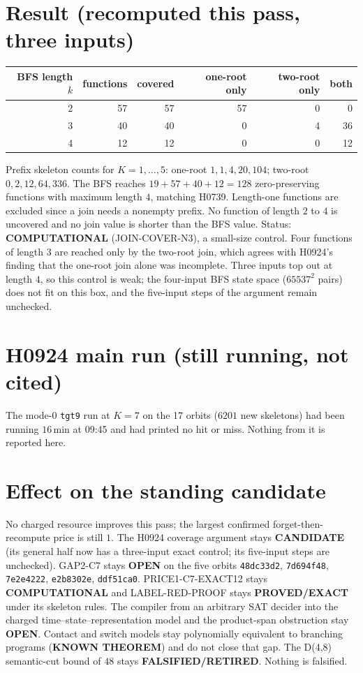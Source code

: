 \documentclass[11pt]{article}
\begin{document}
\section*{Result (recomputed this pass, three inputs)}
\begin{center}
\begin{tabular}{rrrrrr}
BFS length $k$ & functions & covered & one-root only & two-root only & both\\ \hline
2 & 57 & 57 & 57 & 0 & 0\\
3 & 40 & 40 & 0 & 4 & 36\\
4 & 12 & 12 & 0 & 0 & 12\\
\end{tabular}
\end{center}
Prefix skeleton counts for $K=1,\dots,5$: one-root $1,1,4,20,104$; two-root $0,2,12,64,336$. The BFS reaches $19+57+40+12=128$ zero-preserving functions with maximum length $4$, matching H0739. Length-one functions are excluded since a join needs a nonempty prefix. No function of length $2$ to $4$ is uncovered and no join value is shorter than the BFS value. Status: \textbf{COMPUTATIONAL} (JOIN-COVER-N3), a small-size control. Four functions of length $3$ are reached only by the two-root join, which agrees with H0924's finding that the one-root join alone was incomplete. Three inputs top out at length $4$, so this control is weak; the four-input BFS state space ($65537^2$ pairs) does not fit on this box, and the five-input steps of the argument remain unchecked.

\section*{H0924 main run (still running, not cited)}
The mode-0 \texttt{tgt9} run at $K=7$ on the 17 orbits ($6201$ new skeletons) had been running $16$\,min at 09:45 and had printed no hit or miss. Nothing from it is reported here.

\section*{Effect on the standing candidate}
No charged resource improves this pass; the largest confirmed forget-then-recompute price is still $1$. The H0924 coverage argument stays \textbf{CANDIDATE} (its general half now has a three-input exact control; its five-input steps are unchecked). GAP2-C7 stays \textbf{OPEN} on the five orbits \texttt{48dc33d2}, \texttt{7d694f48}, \texttt{7e2e4222}, \texttt{e2b8302e}, \texttt{ddf51ca0}. PRICE1-C7-EXACT12 stays \textbf{COMPUTATIONAL} and LABEL-RED-PROOF stays \textbf{PROVED/EXACT} under its skeleton rules. The compiler from an arbitrary SAT decider into the charged time--state--representation model and the product-span obstruction stay \textbf{OPEN}. Contact and switch models stay polynomially equivalent to branching programs (\textbf{KNOWN THEOREM}) and do not close that gap. The D(4,8) semantic-cut bound of $48$ stays \textbf{FALSIFIED/RETIRED}. Nothing is falsified.
\end{document}
